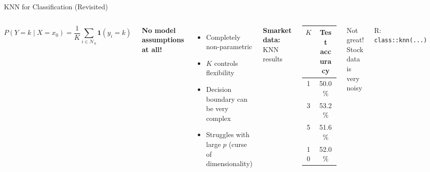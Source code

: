 \documentclass[aspectratio=169, 11pt]{beamer}
\begin{document}
\begin{frame}{KNN for Classification (Revisited)}
\begin{columns}
$$P(Y = k \mid X = x_0) = \frac{1}{K}\sum_{i \in \mathcal{N}_0} \mathbf{1}(y_i = k)$$

\vspace{0.3em}
\textbf{No model assumptions at all!}

\begin{itemize}
  \item Completely non-parametric
  \item $K$ controls flexibility
  \item Decision boundary can be very complex
  \item Struggles with large $p$ (curse of dimensionality)
\end{itemize}

\textbf{Smarket data:} KNN results

\vspace{0.3em}
\begin{tabular}{cc}
\toprule
$K$ & Test accuracy \\
\midrule
1 & 50.0\% \\
3 & 53.2\% \\
5 & 51.6\% \\
10 & 52.0\% \\
\bottomrule
\end{tabular}

\vspace{0.3em}
Not great! Stock data is very noisy

\vspace{0.3em}
\footnotesize R: \texttt{class::knn(...)}
\end{columns}
\end{frame}
\end{document}
